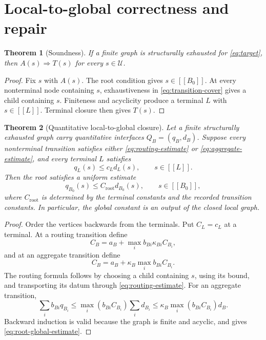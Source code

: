 \documentclass[11pt,reqno]{amsart}
\theoremstyle{plain}
\newtheorem{theorem}{Theorem}[section]
\theoremstyle{definition}
\theoremstyle{remark}
\numberwithin{equation}{section}
\newcommand{\calU}{\mathcal U}
\newcommand{\sem}[1]{[\![#1]\!]}
\begin{document}
\section{Local-to-global correctness and repair}
\label{sec:correctness}

\begin{theorem}[Soundness]\label{thm:soundness}
If a finite graph is structurally exhausted for \eqref{eq:target}, then
\(A(s)\Rightarrow T(s)\) for every \(s\in\calU\).
\end{theorem}

\begin{proof}
Fix \(s\) with \(A(s)\).  The root condition gives \(s\in\sem{B_0}\).
At every nonterminal node containing \(s\), exhaustiveness in
\eqref{eq:transition-cover} gives a child containing \(s\).  Finiteness and
acyclicity produce a terminal \(L\) with \(s\in\sem L\).  Terminal closure
then gives \(T(s)\).
\end{proof}

\begin{theorem}[Quantitative local-to-global closure]
\label{thm:quantitative-closure}
Let a finite structurally exhausted graph carry quantitative interfaces
\(Q_B=(q_B,d_B)\).  Suppose every nonterminal transition satisfies either
\eqref{eq:routing-estimate} or \eqref{eq:aggregate-estimate}, and every terminal
\(L\) satisfies
\[
  q_L(s)\le c_Ld_L(s),\qquad s\in\sem L.
\]
Then the root satisfies a uniform estimate
\begin{equation}\label{eq:root-global-estimate}
  q_{B_0}(s)\le C_{\mathrm{root}}d_{B_0}(s),\qquad s\in\sem{B_0},
\end{equation}
where \(C_{\mathrm{root}}\) is determined by the terminal constants and the recorded
transition constants.  In particular, the global constant is an output of the
closed local graph.
\end{theorem}

\begin{proof}
Order the vertices backwards from the terminals.  Put \(C_L=c_L\) at a
terminal.  At a routing transition define
\[
 C_B=a_B+\max_i b_{Bi}\kappa_{Bi}C_{B_i},
\]
and at an aggregate transition define
\[
 C_B=a_B+\kappa_B\max_i b_{Bi}C_{B_i}.
\]
The routing formula follows by choosing a child containing \(s\), using its
bound, and transporting its datum through \eqref{eq:routing-estimate}.  For an
aggregate transition,
\[
 \sum_i b_{Bi}q_{B_i}
 \le \max_i(b_{Bi}C_{B_i})\sum_i d_{B_i}
 \le \kappa_B\max_i(b_{Bi}C_{B_i})d_B.
\]
Backward induction is valid because the graph is finite and acyclic, and gives
\eqref{eq:root-global-estimate}.
\end{proof}
\end{document}
